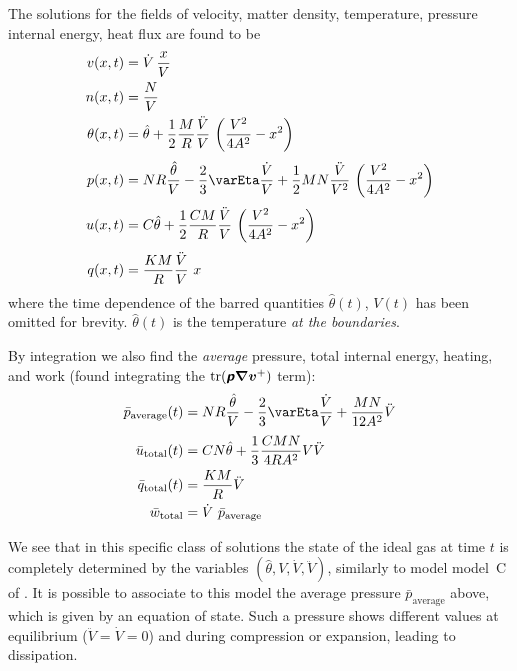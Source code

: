 \documentclass[\ifafour a4paper,12pt,\else a5paper,10pt,\fi%
onecolumn,oneside,article,%
british%
]{memoir}
\theoremstyle{remark}
\theoremstyle{innote}
\newcommand*{\mathte}[1]{\textbf{\textit{\textsf{#1}}}}
\newcommand*{\nabl}{\bm{\nabla}}%
\DeclareMathOperator{\tr}{tr}%
\renewcommand*{\|}[1][]{\nonscript\,#1\vert\nonscript\;\mathopen{}}
\newcommand*{\yno}{N}
\newcommand*{\yt}{\theta}
\newcommand*{\yVb}{V}
\newcommand*{\yVd}{\dot{\yVb}}
\newcommand*{\yVdd}{\ddot{\yVb}}
\newcommand*{\yub}{\bar{u}}
\newcommand*{\yqb}{\bar{q}}
\newcommand*{\ywb}{\bar{w}}
\newcommand*{\yv}{\bm{v}}
\newcommand*{\yp}{\mathte{p}}
\newcommand*{\yE}{\varEta}
\newcommand*{\yC}{C}
\newcommand*{\ytb}{\hat{\yt}}
\newcommand*{\ypb}{\bar{p}}
\begin{document}
The solutions for the fields of velocity, matter density,  temperature, pressure
internal energy, heat flux are found to be
\begin{align}
  \label{eq:v_motion}
  v(x,t) &= \yVd\, \frac{x}{\yVb}
\\
\label{eq:n_motion}
n(x,t) &= \frac{\yno}{\yVb}
\\
\label{eq:T_motion}
  \yt(x,t) &= \ytb + \frac{1}{2} \frac{M}{R}\frac{\yVdd}{\yVb}\
             \biggl(\frac{\yVb^{2}}{4A^{2}} - x^{2}\biggr)
\\[\jot]
\label{eq:p_motion}
  p(x,t) &= NR \frac{\ytb}{\yVb} - \frac{2}{3}\yE \frac{\yVd}{\yVb}
           + \frac{1}{2}MN\frac{\yVdd}{\yVb^{2}}\
           \biggl(\frac{\yVb^{2}}{4A^{2}} - x^{2} \biggr)
  \\[\jot]
\label{eq:u_motion}
  u(x,t) &= \yC \ytb 
                         +  \frac{1}{2} \frac{\yC M}{R}\frac{\yVdd}{\yVb}\
             \biggl(\frac{\yVb^{2}}{4A^{2}} - x^{2}\biggr)
  \\[\jot]
\label{eq:q_motion}
q(x,t) &= \frac{KM}{R} \frac{\yVdd}{\yVb}\ x
\end{align}
where the time dependence of the barred quantities $\ytb(t)$, $\yVb(t)$ has
been omitted for brevity. $\ytb(t)$ is the temperature \emph{at the boundaries}.

By integration we also find the \emph{average} pressure, total internal
energy, heating, and work (found integrating the $\tr(\yp\nabl\yv^{+})$
term):
\begin{align}
  \label{eq:p_motion_avg}
  \ypb_{\text{average}}(t) &= NR \frac{\ytb}{\yVb}
                          - \frac{2}{3}\yE \frac{\yVd}{\yVb}
                          +\frac{MN}{12 A^{2}} \yVdd
  \\[\jot]
\label{eq:u_motion_tot}
  \yub_{\text{total}}(t) &= \yC N \ytb +
                           \frac{1}{3}\frac{\yC MN}{4RA^{2}} \yVb\yVdd
  \\
\label{eq:q_motion_tot}
\yqb_{\text{total}}(t) &= \frac{KM}{R} \yVdd
  \\
\label{eq:work_tot}
  \ywb_{\text{total}} &=
  \yVd \ \ypb_{\text{average}}
\end{align}

We see that in this specific class of solutions the state of the ideal gas
at time $t$ is completely determined by the variables
$(\ytb,\yVb,\yVd,\yVdd)$, similarly to model model~C of
\citeauthor{pekaretal2014}. It is possible to associate to this model the
average pressure $\ypb_{\text{average}}$ above, which is given by an
equation of state. Such a pressure shows different values at equilibrium
($\yVdd=\yVd=0$) and during compression or expansion, leading to
dissipation.
\end{document}
